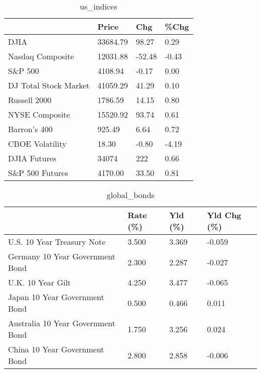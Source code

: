 \documentclass{article}%
\begin{document}
%


\begin{table}[htbp]%
\caption{us\_indices}%
\centering%
\begin{adjustbox}{width=1\textwidth}%
\begin{tabular}{llll}
\toprule
                      &    Price &    Chg &  \%Chg \\
\midrule
                 DJIA & 33684.79 &  98.27 &  0.29 \\
     Nasdaq Composite & 12031.88 & -52.48 & -0.43 \\
              S\&P 500 &  4108.94 &  -0.17 &  0.00 \\
DJ Total Stock Market & 41059.29 &  41.29 &  0.10 \\
         Russell 2000 &  1786.59 &  14.15 &  0.80 \\
       NYSE Composite & 15520.92 &  93.74 &  0.61 \\
         Barron's 400 &   925.49 &   6.64 &  0.72 \\
      CBOE Volatility &    18.30 &  -0.80 & -4.19 \\
         DJIA Futures &    34074 &    222 &  0.66 \\
      S\&P 500 Futures &  4170.00 &  33.50 &  0.81 \\
\bottomrule
\end{tabular}
%
\end{adjustbox}%
\end{table}

%


\begin{table}[htbp]%
\caption{global\_bonds}%
\centering%
\begin{adjustbox}{width=1\textwidth}%
\begin{tabular}{llll}
\toprule
                                  & Rate (\%) & Yld (\%) & Yld Chg (\%) \\
\midrule
       U.S. 10 Year Treasury Note &    3.500 &   3.369 &      -0.059 \\
  Germany 10 Year Government Bond &    2.300 &   2.287 &      -0.027 \\
                U.K. 10 Year Gilt &    4.250 &   3.477 &      -0.065 \\
    Japan 10 Year Government Bond &    0.500 &   0.466 &       0.011 \\
Australia 10 Year Government Bond &    1.750 &   3.256 &       0.024 \\
    China 10 Year Government Bond &    2.800 &   2.858 &      -0.006 \\
\bottomrule
\end{tabular}
%
\end{adjustbox}%
\end{table}
\end{document}
